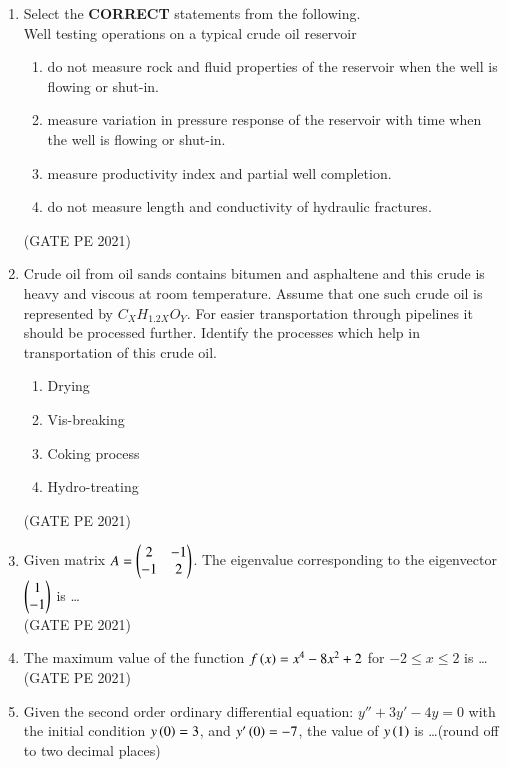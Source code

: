 \documentclass[journal,12pt,onecolumn]{IEEEtran}
\theoremstyle{remark}
\begin{document}
\begin{enumerate}
\item Select the \textbf{CORRECT} statements from the following.\\
Well testing operations on a typical crude oil reservoir\\
\begin{enumerate}
    \item do not measure rock and fluid properties of the reservoir when the well is flowing or shut-in.
    \item measure variation in pressure response of the reservoir with time when the well is flowing or shut-in.
    \item measure productivity index and partial well completion.
    \item do not measure length and conductivity of hydraulic fractures.
\end{enumerate}
\hfill{(GATE PE 2021)}

\item Crude oil from oil sands contains bitumen and asphaltene and this crude is heavy and viscous at room temperature. Assume that one such crude oil is represented by $C_X H_{1.2X}O_Y$. For easier transportation through pipelines it should be processed further. Identify the processes which help in transportation of this crude oil.
\begin{enumerate}
    \item Drying
    \item Vis-breaking
    \item Coking process
    \item Hydro-treating
\end{enumerate}
\hfill{(GATE PE 2021)}

\item Given matrix $A=\begin{pmatrix}
2&-1\\
-1&2\end{pmatrix}$. The eigenvalue corresponding to the eigenvector $\begin{pmatrix}1\\
-1\end{pmatrix}$ is \dots \\

\hfill{(GATE PE 2021)}

\item The maximum value of the function $f\left(x\right)=x^4-8x^2+2$ for $-2\leq x \leq 2$ is \dots\\

\hfill{(GATE PE 2021)}

\item Given the second order ordinary differential equation: $y''+3y'-4y=0$ with the initial condition $y\left(0\right)=3$, and $y'\left(0\right)=-7$, the value  of $y\left(1\right)$ is \dots(round off to two decimal places)\\


\end{enumerate}
\end{document}
